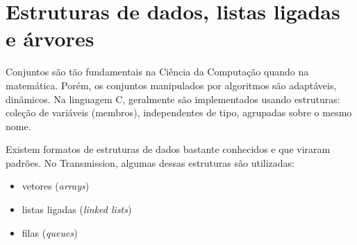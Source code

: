 
\section{Estruturas de dados, listas ligadas e árvores}

\begin{comment}
Aqui vou falar de tipos de estruturas de dados utilizadas no programa, como
\emph{structs} e a sua utilização na implementação de listas ligadas e árvores e em como
estes são usados na implementação de filas.
\end{comment}

Conjuntos são tão fundamentais na Ciência da Computação quando na matemática. Porém, os
conjuntos manipulados por algoritmos são adaptáveis, dinâmicos. Na linguagem C,
geralmente são implementados usando estruturas: coleção de variáveis (membros),
independentes de tipo, agrupadas sobre o mesmo nome.

Existem formatos de estruturas de dados bastante conhecidos e que viraram padrões. No
Transmission, algumas dessas estruturas são utilizadas:

\begin{itemize}
    \item vetores (\emph{arrays})
    \item listas ligadas (\emph{linked lists})
    \item filas (\emph{queues})
\end{itemize}





